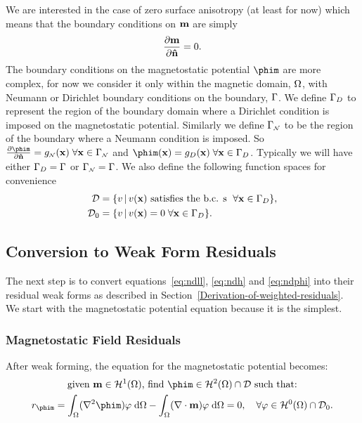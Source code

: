 We are interested in the case of zero surface anisotropy (at least for now) which means that the boundary conditions on $\mathbf{m}$ are simply\cite[pg. 178, 181]{Aharoni1996}
\begin{equation}
  \frac{\partial \mathbf{m}}{\partial \mathbf{\hat{n}}} = 0. \label{eqn:mbc}
\end{equation}
The boundary conditions on the magnetostatic potential $\phim$ are more complex, for now we consider it only within the magnetic domain, $\Omega$, with Neumann or Dirichlet boundary conditions on the boundary, ${\Gamma}$.
We define ${\Gamma}_D$ to represent the region of the boundary domain where a Dirichlet condition is imposed on the magnetostatic potential.
Similarly we define ${\Gamma}_{\scriptscriptstyle{\mathcal{N}}}$ to be the region of the boundary where a Neumann condition is imposed. So $ \ddn{\phim} = g_\Neu(\xv) \; \forall \xv \in \boundd_\Neu$ and $\phim(\xv) = g_D(\xv) \; \forall \xv \in \boundd_D$.
Typically we will have either ${\Gamma}_D = {\Gamma}$ or ${\Gamma}_{\scriptscriptstyle{\mathcal{N}}} = {\Gamma}$.
We also define the following function spaces for convenience
\begin{align}
  \label{eq:037}
  \mathcal{D} & = \{ v \,|\, v(\mathbf{x}) \text{ satisfies the b.c. s } \; \forall \mathbf{x} \in {\Gamma}_D \}, \\
  \mathcal{D}_0 &= \{ v \,|\, v(\mathbf{x}) = 0 \; \forall \mathbf{x} \in {\Gamma}_D \}.
\end{align}



\subsection{Conversion to Weak Form Residuals}

The next step is to convert equations~\eqref{eq:ndll}, \eqref{eq:ndh} and \eqref{eq:ndphi} into their residual weak forms as described in Section~\ref{Derivation-of-weighted-residuals}.
We start with the magnetostatic potential equation because it is the simplest.

\subsubsection{Magnetostatic Field Residuals}
\label{sec:magn-field-resid}

After weak forming, the equation for the magnetostatic potential becomes:
\begin{gather}
  \text{given $\mv \in \sob^1(\magd)$, find $\phim \in \sob^2(\magd) \cap \Dfs$ such that:} \notag \\
  r_{\phim} = \intd{(\lap \phim) \tbf}
  - \intd{(\nabla \cdot \mv) \tbf} = 0,
  \quad \forall \tbf \in \sob^0(\magd) \cap \Dfs_0. \label{eqn:phires1}
\end{gather}

